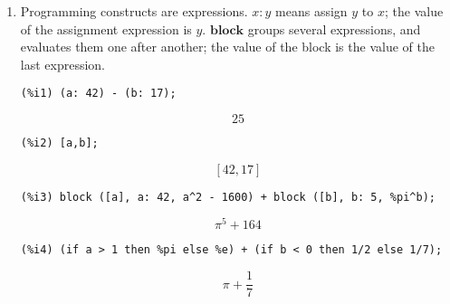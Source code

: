 \documentclass[12pt,leqno]{article}
\begin{document}
\begin{enumerate}
\begin{equation}
\label{eq:doc-group1-code8-6-1}
\end{equation}
\begin{verbatim}
(%i7) M [2][1];
\end{verbatim}
\begin{equation}
29\tag{\%o7}
\label{eq:doc-group1-code8-7-1}
\end{equation}
\begin{verbatim}
(%i8) M2 [2][1];
\end{verbatim}
\begin{equation}
\begin{bmatrix}1 & a \\ b & 7 \\ \end{bmatrix}\tag{\%o8}
\label{eq:doc-group1-code8-8-1}
\end{equation}


\item Programming constructs are expressions.
$x : y$ means assign $y$ to $x$; the value of the assignment expression is $y$.
$\mathbf{block}$ groups several expressions, and evaluates them one after another;
the value of the block is the value of the last expression.
\begin{verbatim}
(%i1) (a: 42) - (b: 17);
\end{verbatim}
\begin{equation}
25\tag{\%o1}
\label{eq:doc-group1-code9-1-1}
\end{equation}
\begin{verbatim}
(%i2) [a,b];
\end{verbatim}
\begin{equation}
\left[ 42 , 17 \right] \tag{\%o2}
\label{eq:doc-group1-code9-2-1}
\end{equation}
\begin{verbatim}
(%i3) block ([a], a: 42, a^2 - 1600) + block ([b], b: 5, %pi^b);
\end{verbatim}
\begin{equation}
\pi^5+164\tag{\%o3}
\label{eq:doc-group1-code9-3-1}
\end{equation}
\begin{verbatim}
(%i4) (if a > 1 then %pi else %e) + (if b < 0 then 1/2 else 1/7);
\end{verbatim}
\begin{equation}
\pi+\frac{1}{7}\tag{\%o4}
\label{eq:doc-group1-code9-4-1}
\end{equation}



\end{enumerate}
\end{document}
